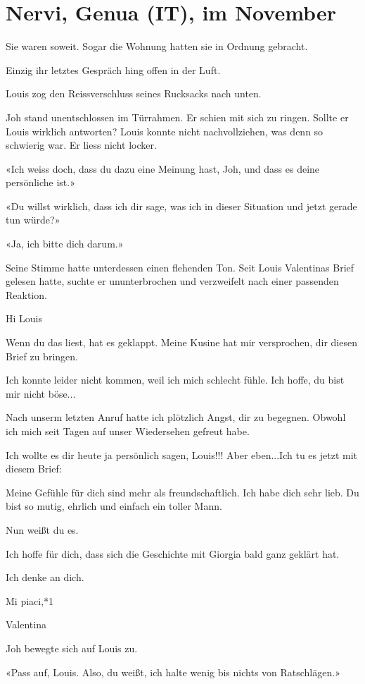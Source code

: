 \section{Nervi, Genua (IT), im
November}\label{nervi-genua-it-im-november}

Sie waren soweit. Sogar die Wohnung hatten sie in Ordnung gebracht.

Einzig ihr letztes Gespräch hing offen in der Luft.

Louis zog den Reissverschluss seines Rucksacks nach unten.

Joh stand unentschlossen im Türrahmen. Er schien mit sich zu ringen.
Sollte er Louis wirklich antworten? Louis konnte nicht nachvollziehen,
was denn so schwierig war. Er liess nicht locker.

«Ich weiss doch, dass du dazu eine Meinung hast, Joh, und dass es deine
persönliche ist.»

«Du willst wirklich, dass ich dir sage, was ich in dieser Situation und
jetzt gerade tun würde?»

«Ja, ich bitte dich darum.»

Seine Stimme hatte unterdessen einen flehenden Ton. Seit Louis
Valentinas Brief gelesen hatte, suchte er ununterbrochen und verzweifelt
nach einer passenden Reaktion.

Hi Louis

Wenn du das liest, hat es geklappt. Meine Kusine hat mir versprochen,
dir diesen Brief zu bringen.

Ich konnte leider nicht kommen, weil ich mich schlecht fühle. Ich hoffe,
du bist mir nicht böse...

Nach unserm letzten Anruf hatte ich plötzlich Angst, dir zu begegnen.
Obwohl ich mich seit Tagen auf unser Wiedersehen gefreut habe.

Ich wollte es dir heute ja persönlich sagen, Louis!!! Aber eben...Ich tu
es jetzt mit diesem Brief:

Meine Gefühle für dich sind mehr als freundschaftlich. Ich habe dich
sehr lieb. Du bist so mutig, ehrlich und einfach ein toller Mann.

Nun weißt du es.

Ich hoffe für dich, dass sich die Geschichte mit Giorgia bald ganz
geklärt hat.

Ich denke an dich.

Mi piaci,*1

Valentina

Joh bewegte sich auf Louis zu.

«Pass auf, Louis. Also, du weißt, ich halte wenig bis nichts von
Ratschlägen.»

